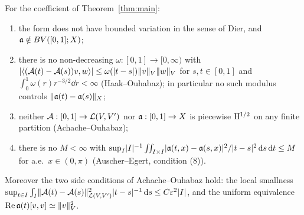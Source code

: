 \begin{corollary}
  \label{cor:endpoint}
  \leanok
  For the coefficient of Theorem~\ref{thm:main}:
  \begin{enumerate}
    \item the form does not have bounded variation in the sense of Dier, and
      $\mathfrak{a}\notin BV([0,1];X)$;
    \item there is no non-decreasing $\omega:[0,1]\to[0,\infty)$ with
      $\lvert \langle(\mathcal{A}(t)-\mathcal{A}(s))v,w\rangle\rvert\leq\omega(\lvert t-s\rvert)\lVert v\rVert_V\lVert w\rVert_V$ for
      $s,t\in[0,1]$ and $\int_0^1\omega(r)r^{-3/2}\dd r<\infty$ (Haak--Ouhabaz); in particular no
      such modulus controls $\lVert \mathfrak{a}(t)-\mathfrak{a}(s)\rVert_X$;
    \item neither $\mathcal{A}:[0,1]\to\mathcal{L}(V,V')$ nor $\mathfrak{a}:[0,1]\to X$ is piecewise $\mathrm{H}^{1/2}$ on any
      finite partition (Achache--Ouhabaz);
    \item there is no $M<\infty$ with
      $\sup_{I}\lvert I\rvert^{-1}\iint_{I\times I}\lvert \mathfrak{a}(t,x)-\mathfrak{a}(s,x)\rvert^2/\lvert t-s\rvert^2\,\mathrm{d} s\,\mathrm{d} t\leq M$
      for a.e.\ $x\in(0,\pi)$ (Auscher--Egert, condition (8)).
  \end{enumerate}
  Moreover the two side conditions of Achache--Ouhabaz hold: the local smallness
  $\sup_{t\in I}\int_I\lVert \mathcal{A}(t)-\mathcal{A}(s)\rVert^2_{\mathcal{L}(V,V')}\lvert t-s\rvert^{-1}\,\mathrm{d} s\leq C\varepsilon^2\lvert I\rvert$, and the
  uniform equivalence $\operatorname{Re}\mathfrak{a}(t)[v,v]\simeq\lVert v\rVert_V^2$.
\end{corollary}

